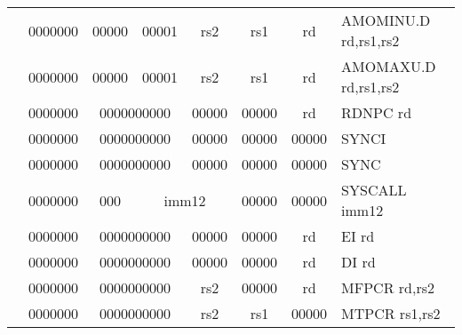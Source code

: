 \begin{table}[p]
\begin{small}
\begin{center}
\begin{tabular}{rcccccccccl}
&
\multicolumn{1}{|c|}{0000000} &
\multicolumn{3}{c|}{00000} &
\multicolumn{2}{c|}{00001} &
\multicolumn{1}{c|}{rs2} &
\multicolumn{1}{c|}{rs1} &
\multicolumn{1}{c|}{rd} & AMOMINU.D rd,rs1,rs2 \\
\cline{2-10}
  

&
\multicolumn{1}{|c|}{0000000} &
\multicolumn{3}{c|}{00000} &
\multicolumn{2}{c|}{00001} &
\multicolumn{1}{c|}{rs2} &
\multicolumn{1}{c|}{rs1} &
\multicolumn{1}{c|}{rd} & AMOMAXU.D rd,rs1,rs2 \\
\cline{2-10}
  

&
\multicolumn{1}{|c|}{0000000} &
\multicolumn{5}{c|}{0000000000} &
\multicolumn{1}{c|}{00000} &
\multicolumn{1}{c|}{00000} &
\multicolumn{1}{c|}{rd} & RDNPC rd \\
\cline{2-10}
  

&
\multicolumn{1}{|c|}{0000000} &
\multicolumn{5}{c|}{0000000000} &
\multicolumn{1}{c|}{00000} &
\multicolumn{1}{c|}{00000} &
\multicolumn{1}{c|}{00000} & SYNCI  \\
\cline{2-10}
  

&
\multicolumn{1}{|c|}{0000000} &
\multicolumn{5}{c|}{0000000000} &
\multicolumn{1}{c|}{00000} &
\multicolumn{1}{c|}{00000} &
\multicolumn{1}{c|}{00000} & SYNC  \\
\cline{2-10}
  

&
\multicolumn{1}{|c|}{0000000} &
\multicolumn{2}{c|}{000} &
\multicolumn{4}{c|}{imm12} &
\multicolumn{1}{c|}{00000} &
\multicolumn{1}{c|}{00000} & SYSCALL imm12 \\
\cline{2-10}
  

&
\multicolumn{1}{|c|}{0000000} &
\multicolumn{5}{c|}{0000000000} &
\multicolumn{1}{c|}{00000} &
\multicolumn{1}{c|}{00000} &
\multicolumn{1}{c|}{rd} & EI rd \\
\cline{2-10}
  

&
\multicolumn{1}{|c|}{0000000} &
\multicolumn{5}{c|}{0000000000} &
\multicolumn{1}{c|}{00000} &
\multicolumn{1}{c|}{00000} &
\multicolumn{1}{c|}{rd} & DI rd \\
\cline{2-10}
  

&
\multicolumn{1}{|c|}{0000000} &
\multicolumn{5}{c|}{0000000000} &
\multicolumn{1}{c|}{rs2} &
\multicolumn{1}{c|}{00000} &
\multicolumn{1}{c|}{rd} & MFPCR rd,rs2 \\
\cline{2-10}
  

&
\multicolumn{1}{|c|}{0000000} &
\multicolumn{5}{c|}{0000000000} &
\multicolumn{1}{c|}{rs2} &
\multicolumn{1}{c|}{rs1} &
\multicolumn{1}{c|}{00000} & MTPCR rs1,rs2 \\
\cline{2-10}
  


\end{tabular}
\end{center}
\end{small}
\end{table}
